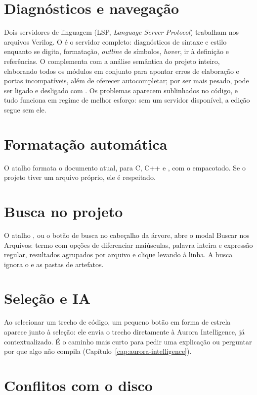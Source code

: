\section{Diagnósticos e navegação}

Dois servidores de linguagem (LSP, \textit{Language Server Protocol}) trabalham nos arquivos Verilog. O  é o servidor completo: diagnósticos de sintaxe e estilo enquanto se digita, formatação, \textit{outline} de símbolos, \textit{hover}, ir à definição e referências. O  complementa com a análise semântica do projeto inteiro, elaborando todos os módulos em conjunto para apontar erros de elaboração e portas incompatíveis, além de oferecer autocompletar; por ser mais pesado, pode ser ligado e desligado com . Os problemas aparecem sublinhados no código, e tudo funciona em regime de melhor esforço: sem um servidor disponível, a edição segue sem ele.

\section{Formatação automática}

O atalho  formata o documento atual, para C, C++ e \cmm{}, com o  empacotado. Se o projeto tiver um arquivo  próprio, ele é respeitado.

\section{Busca no projeto}

O atalho , ou o botão de busca no cabeçalho da árvore, abre o modal Buscar nos Arquivos: termo com opções de diferenciar maiúsculas, palavra inteira e expressão regular, resultados agrupados por arquivo e clique levando à linha. A busca ignora o  e as pastas de artefatos.

\section{Seleção e IA}

Ao selecionar um trecho de código, um pequeno botão em forma de estrela aparece junto à seleção: ele envia o trecho diretamente à Aurora Intelligence, já contextualizado. É o caminho mais curto para pedir uma explicação ou perguntar por que algo não compila (Capítulo~\ref{cap:aurora-intelligence}).

\section{Conflitos com o disco}

